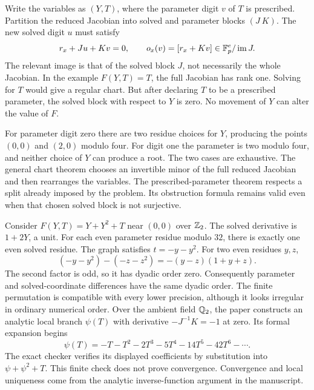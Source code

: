 Write the variables as $(Y,T)$, where the parameter digit $v$ of $T$ is prescribed. Partition the reduced Jacobian into solved and parameter blocks $(J\ K)$. The new solved digit $u$ must satisfy
\[
 r_x+Ju+Kv=0,\qquad o_x(v)=[r_x+Kv]\in\mathbb F_p^e/\operatorname{im} J.
\]
The relevant image is that of the solved block $J$, not necessarily the whole Jacobian.
In the example $F(Y,T)=T$, the full Jacobian has rank one. Solving for $T$ would give a regular chart. But after declaring $T$ to be a prescribed parameter, the solved block with respect to $Y$ is zero. No movement of $Y$ can alter the value of $F$.

For parameter digit zero there are two residue choices for $Y$, producing the points $(0,0)$ and $(2,0)$ modulo four. For digit one the parameter is two modulo four, and neither choice of $Y$ can produce a root. The two cases are exhaustive.
The general chart theorem chooses an invertible minor of the full reduced Jacobian and then rearranges the variables. The prescribed-parameter theorem respects a split already imposed by the problem. Its obstruction formula remains valid even when that chosen solved block is not surjective.

Consider $F(Y,T)=Y+Y^2+T$ near $(0,0)$ over $\mathbb Z_2$. The solved derivative is $1+2Y$, a unit. For each even parameter residue modulo $32$, there is exactly one even solved residue.
The graph satisfies $t=-y-y^2$. For two even residues $y,z$,
\[
 (-y-y^2)-(-z-z^2)=-(y-z)(1+y+z).
\]
The second factor is odd, so it has dyadic order zero. Consequently parameter and solved-coordinate differences have the same dyadic order. The finite permutation is compatible with every lower precision, although it looks irregular in ordinary numerical order.
Over the ambient field $\mathbb Q_2$, the paper constructs an analytic local branch $\psi(T)$ with derivative $-J^{-1}K=-1$ at zero. Its formal expansion begins
\[
 \psi(T)=-T-T^2-2T^3-5T^4-14T^5-42T^6-\cdots.
\]
The exact checker verifies its displayed coefficients by substitution into $\psi+\psi^2+T$. This finite check does not prove convergence. Convergence and local uniqueness come from the analytic inverse-function argument in the manuscript.

